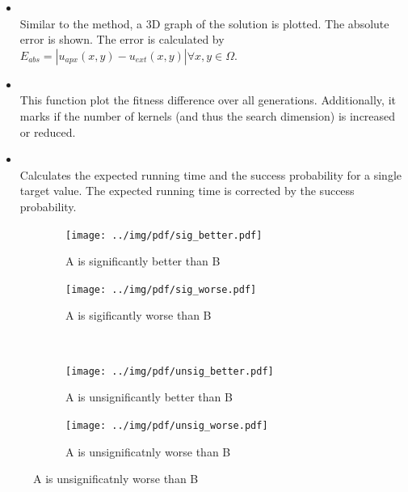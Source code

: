 \documentclass[.\jobname.tex]{subfiles}
\begin{document}
\begin{itemize}
	\item {} \\
	Similar to the 	 method, a 3D graph of the solution is plotted. The absolute error is shown. The error is calculated by $E_{abs}  = \left| u_{apx}(x,y) - u_{ext}(x,y) \right| \forall x,y \in \Omega$. 
	\item {} \\
	This function plot the fitness difference over all generations. Additionally, it marks if the number of kernels (and thus the search dimension) is increased or reduced. 
	\item {} \\
	Calculates the expected running time and the success probability for a single target value. The expected running time is corrected by the success probability. 
\end{itemize}

\begin{figure}[H]
	\centering
	\begin{subfigure}[b]{0.5\linewidth}
		\centering
		\texttt{[image: ../img/pdf/sig\_better.pdf]}
		\caption{A is significantly better than B}
		\label{fig:stats_wilcoxon_examples_sigificantly_better}
	\end{subfigure}%
	\begin{subfigure}[b]{0.5\linewidth}
		\centering
		\texttt{[image: ../img/pdf/sig\_worse.pdf]}
		\caption{A is sigificantly worse than B}
		\label{fig:stats_wilcoxon_examples_sigificantly_worse}
	\end{subfigure}%
	\\
	\begin{subfigure}[b]{0.5\linewidth}
		\centering
		\texttt{[image: ../img/pdf/unsig\_better.pdf]}
		\caption{A is unsignificantly better than B}
		\label{fig:stats_wilcoxon_examples_insigificantly_better}
	\end{subfigure}%
	\begin{subfigure}[b]{0.5\linewidth}
		\centering
		\texttt{[image: ../img/pdf/unsig\_worse.pdf]}
		\caption{A is unsignificatnly worse than B}
		\label{fig:stats_wilcoxon_examples_insigificantly_worse}
	\end{subfigure}%
	\label{fig:stats_wilcoxon_examples}
\end{figure}
\end{document}
